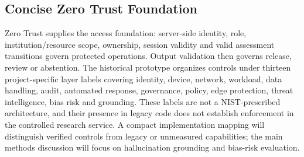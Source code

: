 \subsection{Concise Zero Trust Foundation}
Zero Trust supplies the access foundation: server-side identity, role, institution/resource scope, ownership, session validity and valid assessment transitions govern protected operations. Output validation then governs release, review or abstention. The historical prototype organizes controls under thirteen project-specific layer labels covering identity, device, network, workload, data handling, audit, automated response, governance, policy, edge protection, threat intelligence, bias risk and grounding. These labels are not a NIST-prescribed architecture, and their presence in legacy code does not establish enforcement in the controlled research service. A compact implementation mapping will distinguish verified controls from legacy or unmeasured capabilities; the main methods discussion will focus on hallucination grounding and bias-risk evaluation.
